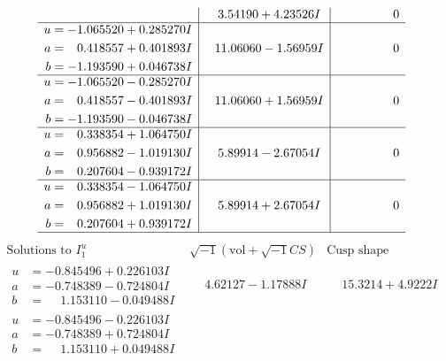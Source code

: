 \documentclass[1p]{elsarticle_modified}
\theoremstyle{definition}
\newcommand{\I}{\sqrt{-1}}
\begin{document}
$$\begin{array}{c|c|c}
 & \phantom{-}3.54190 + 4.23526 I & \phantom{-0.000000 } 0 \\ \hline\begin{aligned}
u &= -1.065520 + 0.285270 I \\
a &= \phantom{-}0.418557 + 0.401893 I \\
b &= -1.193590 + 0.046738 I\end{aligned}
 & \phantom{-}11.06060 - 1.56959 I & \phantom{-0.000000 } 0 \\ \hline\begin{aligned}
u &= -1.065520 - 0.285270 I \\
a &= \phantom{-}0.418557 - 0.401893 I \\
b &= -1.193590 - 0.046738 I\end{aligned}
 & \phantom{-}11.06060 + 1.56959 I & \phantom{-0.000000 } 0 \\ \hline\begin{aligned}
u &= \phantom{-}0.338354 + 1.064750 I \\
a &= \phantom{-}0.956882 - 1.019130 I \\
b &= \phantom{-}0.207604 - 0.939172 I\end{aligned}
 & \phantom{-}5.89914 - 2.67054 I & \phantom{-0.000000 } 0 \\ \hline\begin{aligned}
u &= \phantom{-}0.338354 - 1.064750 I \\
a &= \phantom{-}0.956882 + 1.019130 I \\
b &= \phantom{-}0.207604 + 0.939172 I\end{aligned}
 & \phantom{-}5.89914 + 2.67054 I & \phantom{-0.000000 } 0\\
 \hline 
 \end{array}$$\newpage$$\begin{array}{c|c|c}  
\text{Solutions to }I^u_{1}& \I (\text{vol} + \sqrt{-1}CS) & \text{Cusp shape}\\
 \hline 
\begin{aligned}
u &= -0.845496 + 0.226103 I \\
a &= -0.748389 - 0.724804 I \\
b &= \phantom{-}1.153110 - 0.049488 I\end{aligned}
 & \phantom{-}4.62127 - 1.17888 I & \phantom{-}15.3214 + 4.9222 I \\ \hline\begin{aligned}
u &= -0.845496 - 0.226103 I \\
a &= -0.748389 + 0.724804 I \\
b &= \phantom{-}1.153110 + 0.049488 I\end{aligned}

\end{array}$$
\end{document}
